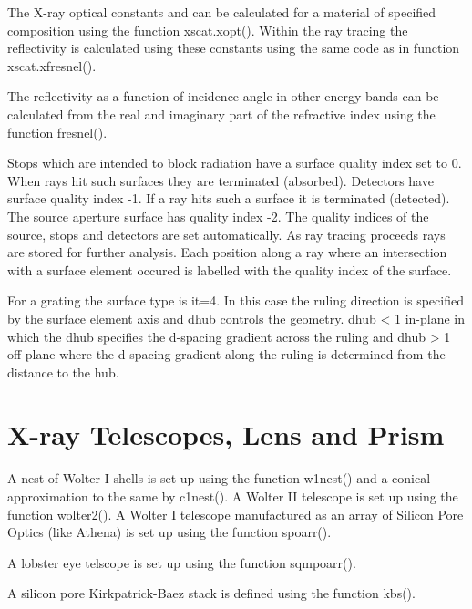 \documentclass[letterpaper,10pt,english]{sphinxmanual}
\begin{document}
The X-ray optical constants  and  can be calculated for
a material of specified composition using the function xscat.xopt().
Within the ray tracing the reflectivity is calculated using these
constants using the same code as in function xscat.xfresnel().

The reflectivity as a function of incidence angle in other energy bands can be
calculated from the real and imaginary part of the refractive index using
the function fresnel().

Stops which are intended to block radiation have a surface quality index
set to 0. When rays hit such surfaces they are terminated (absorbed).
Detectors have surface quality index -1. If a ray hits such a surface
it is terminated (detected).
The source aperture surface has quality index -2.
The quality indices of the source, stops and detectors are set automatically.
As ray tracing proceeds rays are stored for further analysis. Each position
along a ray where an intersection with a surface element occured is
labelled with the quality index of the surface.

For a grating the surface type is it=4.
In this case the ruling direction is specified by
the surface element axis and dhub controls the geometry. dhub \textless{} 1 in-plane
in which the dhub specifies the d-spacing gradient across the ruling
and dhub \textgreater{} 1 off-plane where the d-spacing gradient along the ruling is
determined from the distance to the hub.


\section{X-ray Telescopes, Lens and Prism}
\label{\detokenize{xsrt_telescopes:x-ray-telescopes-lens-and-prism}}\label{\detokenize{xsrt_telescopes::doc}}

A nest of Wolter I shells is set up using the function w1nest() and
a conical approximation to the same by c1nest(). A Wolter II telescope
is set up using the function wolter2().
A Wolter I telescope manufactured as an array of Silicon Pore Optics
(like Athena) is set up using the function spoarr().


A lobster eye telscope is set up using the function sqmpoarr().

A silicon pore Kirkpatrick-Baez stack is defined using the function
kbs().
\end{document}
